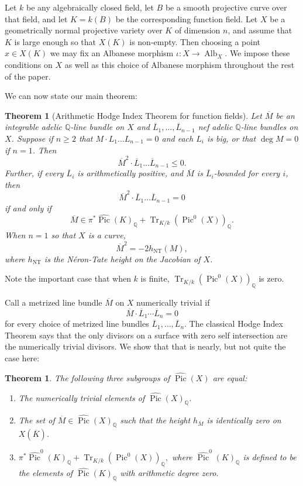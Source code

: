 \documentclass[times, doublespace]{amsart}
\numberwithin{equation}{section}
\theoremstyle{plain}
\newtheorem{theorem}[equation]{Theorem}
\theoremstyle{definition}
\DeclareMathOperator{\Pic}{Pic}
\DeclareMathOperator{\Alb}{Alb}
\DeclareMathOperator{\NT}{NT}
\newcommand{\Tr}{\operatorname{Tr}}
\newcommand{\imP}[1]{\Tr_{K/k}\left(\Pic^0(#1)\right)}
\newcommand{\Q}{\mathbb{Q}}
\begin{document}
Let $k$ be any algebraically closed field, let $B$ be a smooth projective curve over that field, and let $K=k(B)$ be the corresponding function field. Let $X$ be a geometrically normal projective variety over $K$ of dimension $n$, and assume that $K$ is large enough so that $X(K)$ is non-empty. Then choosing a point $x\in X(K)$ we may fix an Albanese morphism $\iota:X\to\Alb_X$. We impose these conditions on $X$ as well as this choice of Albanese morphism throughout the rest of the paper.


We can now state our main theorem:
\begin{theorem}[Arithmetic Hodge Index Theorem for function fields]\label{hodgeindex}
Let $\overline{M}$ be an integrable adelic $\Q$-line bundle on $X$ and $\overline{L}_1,\dots,\overline{L}_{n-1}$ nef adelic $\Q$-line bundles on $X$. Suppose if $n\ge2$ that $M\cdot L_1\dots L_{n-1}=0$ and each $L_i$ is big, or that $\deg M=0$ if $n=1$. Then
\[\overline{M}^2\cdot\overline{L}_{1}\dots\overline{L}_{n-1}\le0.\] 
Further, if every $\overline{L}_{i}$ is arithmetically positive, and $\overline M$ is $\overline L_i$-bounded for every $i$, then
\[\overline{M}^2\cdot\overline{L}_{1}\dots\overline{L}_{n-1}=0\]
if and only if 
\[\overline M\in\pi^*\widehat{\Pic}(K)_{\Q}+\Tr_{K/k}\left(\Pic^0(X)\right)_{\Q}.\]
When $n=1$ so that $X$ is a curve,
\[\overline M^2=-2h_{\NT}(M),\]
where $h_{\NT}$ is the N\'eron-Tate height on the Jacobian of $X$.
\end{theorem}

Note the important case that when $k$ is finite, $\Tr_{K/k}\left(\Pic^0(X)\right)_{\Q}$ is zero.

Call a metrized line bundle $\overline M$ on $X$ numerically trivial if 
\[\overline M\cdot \overline L_1\cdots \overline L_n=0\]
for every choice of metrized line bundles $\overline L_1,\dots,\overline L_n$. The classical Hodge Index Theorem says that the only divisors on a surface with zero self intersection are the numerically trivial divisors. We show that that is nearly, but not quite the case here:
\begin{theorem}\label{numericallytrivial}
The following three subgroups of $\widehat{\Pic}(X)$ are equal:
\begin{enumerate}
\item
The numerically trivial elements of $\widehat{\Pic}(X)_{\Q}$.
\item 
The set of $\overline M\in\widehat{\Pic}(X)_{\Q}$ such that the height $h_{\overline M}$ is identically zero on $X(\overline K)$.
\item
$\pi^*\widehat{\Pic}^0(K)_{\Q}+\imP{X}_{\Q},$ where $\widehat{\Pic}^0(K)_{\Q}$ is defined to be the elements of $\widehat{\Pic}(K)_{\Q}$ with arithmetic degree zero.
\end{enumerate}
\end{theorem}
\end{document}
